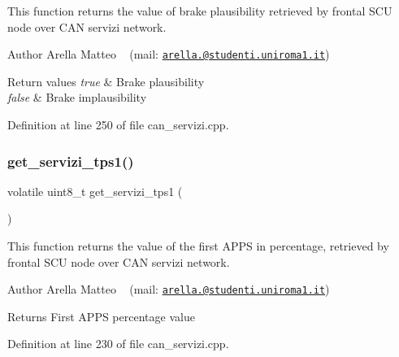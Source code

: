 This function returns the value of brake plausibility retrieved by frontal S\+CU node over C\+AN servizi network. 

\begin{DoxyAuthor}{Author}
Arella Matteo ~\newline
 (mail\+: \href{mailto:arella.1646983@studenti.uniroma1.it}{\tt arella.@studenti.\+uniroma1.\+it})
\end{DoxyAuthor}

\begin{DoxyRetVals}{Return values}
{\em true} & Brake plausibility \\
\hline
{\em false} & Brake implausibility \\
\hline
\end{DoxyRetVals}


Definition at line 250 of file can\+\_\+servizi.\+cpp.

\mbox{\label{group___c_a_n__servizi__group_gac899876f81f391e2daafcd8b22d2f32e}} 
\subsubsection{\texorpdfstring{get\+\_\+servizi\+\_\+tps1()}{get\_servizi\_tps1()}}
{\footnotesize\ttfamily volatile uint8\+\_\+t get\+\_\+servizi\+\_\+tps1 (\begin{DoxyParamCaption}{ }\end{DoxyParamCaption})}



This function returns the value of the first A\+P\+PS in percentage, retrieved by frontal S\+CU node over C\+AN servizi network. 

\begin{DoxyAuthor}{Author}
Arella Matteo ~\newline
 (mail\+: \href{mailto:arella.1646983@studenti.uniroma1.it}{\tt arella.@studenti.\+uniroma1.\+it})
\end{DoxyAuthor}
\begin{DoxyReturn}{Returns}
First A\+P\+PS percentage value 
\end{DoxyReturn}


Definition at line 230 of file can\+\_\+servizi.\+cpp.

\mbox{\label{group___c_a_n__servizi__group_ga431b31efe978864b1a2db0d57a5b572a}} 

